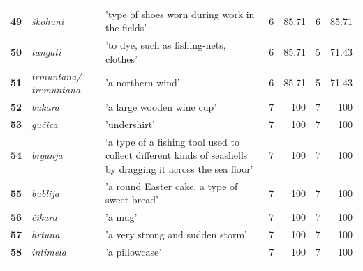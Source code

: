 \documentclass[output=paper]{LSP/langsci}
\begin{document}
\begin{table}
{\begin{tabular}{lp{2cm}p{5cm}lrlr}
{\bfseries 49} & {\itshape škohuni} & 'type of shoes worn during work in the fields' & 6 & 85.71 & 6 & 85.71\\

{\bfseries 50} & {\itshape tangati} & 'to dye, such as fishing-nets, clothes' & 6 & 85.71 & 5 & 71.43\\

{\bfseries 51} & {\itshape trmuntana/ tremuntana} & 'a northern wind' & 6 & 85.71 & 5 & 71.43\\

{\bfseries 52} & {\itshape bukara} & 'a large wooden wine cup' & 7 & 100 & 7 & 100\\

{\bfseries 53} & {\itshape gučica} & 'undershirt' & 7 & 100 & 7 & 100\\

{\bfseries 54} & {\itshape brganja} & ‘a type of a fishing tool used to collect different kinds of seashells by dragging it across the sea floor’ & 7 & 100 & 7 & 100\\

{\bfseries 55} & {\itshape bublija} & 'a round Easter cake, a type of sweet bread' & 7 & 100 & 7 & 100\\

{\bfseries 56} & {\itshape čikara} & 'a mug' & 7 & 100 & 7 & 100\\

{\bfseries 57} & {\itshape hrtuna} & 'a very strong and sudden storm' & 7 & 100 & 7 & 100\\

{\bfseries 58} & {\itshape intimela} & 'a pillowcase' & 7 & 100 & 7 & 100\\
\lspbottomrule
\end{tabular}
}
\end{table}
\end{document}
